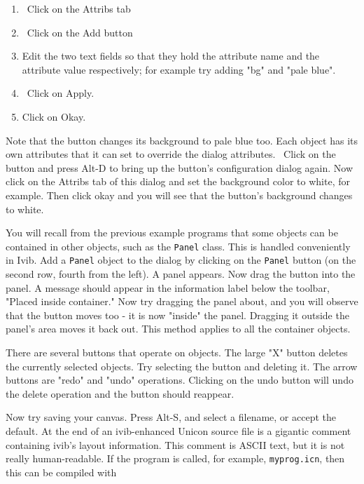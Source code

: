 \begin{enumerate}
\item \ Click on the Attribs tab

\item \ Click on the Add button


\item Edit the two text fields so that they hold the attribute name and
the attribute value respectively; for example try adding
"bg" and "pale blue".
\item \ Click on Apply.

\item Click on Okay.
\end{enumerate}

\bigskip

Note that the button changes its background to pale blue too. Each
object has its own attributes that it can set to override the dialog
attributes. \ Click on the button and press Alt-D to bring up the
button's configuration dialog again. Now click on the
Attribs tab of this dialog and set the background color to white, for
example. Then click okay and you will see that the
button's background changes to white.

You will recall from the previous example programs that some objects can
be contained in other objects, such as the \texttt{Panel} class. This
is handled conveniently in Ivib. Add a \texttt{Panel} object to the
dialog by clicking on the \texttt{Panel} button (on the second row,
fourth from the left). A panel appears. Now drag the button into the
panel. A message should appear in the information label below the
toolbar, "Placed inside container." Now try
dragging the panel about, and you will observe that the button moves
too - it is now "inside" the panel.
Dragging it outside the panel's area moves it back
out. This method applies to all the container objects.

There are several buttons that operate on objects. The large
"X" button deletes the currently selected
objects. Try selecting the button and deleting it. The arrow buttons
are "redo" and
"undo" operations. Clicking on the undo
button will undo the delete operation and the button should reappear.

Now try saving your canvas. Press Alt-S, and select a filename, or
accept the default. At the end of an ivib-enhanced Unicon source file
is a gigantic comment containing ivib's layout
information. This comment is ASCII text, but it is not
really human-readable. If the program is called, for example,
\texttt{myprog.icn}, then this can be compiled with

